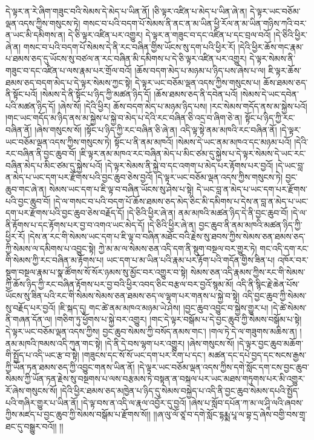 དེ་ལྟར་ན་རེ་ཞིག་གཟུང་བའི་སེམས་དེ་མེད་པ་ཡིན་ནོ། །ཅི་ལྟར་འཛིན་པ་མེད་པ་ཡིན་ཞེ་ན། དེ་ལྟར་ཡང་བཅོམ་ལྡན་འདས་ཀྱིས་གསུངས་ཏེ། གསང་བ་པའི་བདག་པོ་སེམས་ནི་ནང་ན་མ་ཡིན་ཕྱི་རོལ་ན་མ་ཡིན་གཉིས་ཀའི་བར་ན་ཡང་མི་དམིགས་ན། དེ་ཅི་ལྟར་འཛིན་པར་འགྱུར། དེ་ལྟར་ན་གཟུང་བ་དང་འཛིན་པ་དང་བྲལ་བའོ། །དེ་ཅིའི་ཕྱིར་ཞེ་ན། གསང་བ་པའི་བདག་པོ་སེམས་དེ་ནི་རང་བཞིན་གྱིས་ཡོངས་སུ་དག་པའི་ཕྱིར་རོ། །དེའི་ཕྱིར་ཆོས་གང་རྣམ་པ་ཐམས་ཅད་དུ་ཡོངས་སུ་བཙལ་ན་རང་བཞིན་མི་དམིགས་པ་དེ་ཅི་ལྟར་འཛིན་པར་འགྱུར། དེ་ལྟར་སེམས་ནི་གཟུང་བ་དང་འཛིན་པ་ལས་རྣམ་པར་གྲོལ་བའོ། །ཆོས་བདག་མེད་པ་མཉམ་པ་ཉིད་པས་ཞེས་པ་ལ། ཇི་ལྟར་ཆོས་ཐམས་ཅད་བདག་མེད་པ་དེ་ལྟར་སེམས་ཀྱང་སྟེ། དེ་ལྟར་ཡང་བཅོམ་ལྡན་འདས་ཀྱིས་གསུངས་པ། ཆོས་ཐམས་ཅད་ནི་སྟོང་པའོ། །སེམས་དེ་ནི་སྟོང་པ་ཉིད་ཀྱི་མཚན་ཉིད་དོ། །ཆོས་ཐམས་ཅད་ནི་དབེན་པའོ། །སེམས་དེ་ཡང་དབེན་པའི་མཚན་ཉིད་དོ། །ཞེས་སོ། །དེའི་ཕྱིར། ཆོས་བདག་མེད་པ་མཉམ་ཉིད་པས། །རང་སེམས་གདོད་ནས་མ་སྐྱེས་པའོ། །གང་ཡང་གདོད་མ་ཉིད་ནས་མ་སྐྱེས་པ་སྐྱེ་བ་མེད་པ་དེའི་རང་བཞིན་ཅི་འདྲ་བ་ཞིག་ཅེ་ན། སྟོང་པ་ཉིད་ཀྱི་རང་བཞིན་ནོ། །ཞེས་གསུངས་སོ། །སྟོང་པ་ཉིད་ཀྱི་རང་བཞིན་ཅི་ཞེ་ན། འདི་ལྟ་སྟེ་ནམ་མཁའི་རང་བཞིན་ནོ། །དེ་ལྟར་ཡང་བཅོམ་ལྡན་འདས་ཀྱིས་གསུངས་ཏེ། སྟོང་པ་ནི་ནམ་མཁའོ། །སེམས་དེ་ཡང་ནམ་མཁའ་དང་མཉམ་པའོ། །དེའི་རང་བཞིན་ནི་བྱང་ཆུབ་བོ། །ཇི་ལྟར་ནམ་མཁའ་རང་བཞིན་མེད་པ་མིང་ཙམ་དུ་སྐྱེས་པ་དེ་ལྟར་སེམས་དེ་ཡང་རང་བཞིན་མེད་པ་མིང་ཙམ་དུ་སྐྱེས་པའོ། །དེ་ལྟར་སེམས་ནི་སྐྱེ་བ་དང་འགག་པ་མེད་པར་རྟོགས་པར་བྱའོ། །དེ་ཡང་བླ་ན་མེད་པ་ཡང་དག་པར་རྫོགས་པའི་བྱང་ཆུབ་ཅེས་བྱའོ། །དེ་ལྟར་ཡང་བཅོམ་ལྡན་འདས་ཀྱིས་གསུངས་ཏེ། བྱང་ཆུབ་གང་ཞེ་ན། སེམས་ཡང་དག་པ་ཇི་ལྟ་བ་བཞིན་ཡོངས་སུ་ཤེས་པ་སྟེ། དེ་ཡང་བླ་ན་མེད་པ་ཡང་དག་པར་རྫོགས་པའི་བྱང་ཆུབ་བོ། །དེ་ལ་གསང་བ་པའི་བདག་པོ་ཆོས་ཐམས་ཅད་མེད་ཅིང་མི་དམིགས་པ་དེས་ན་བླ་ན་མེད་པ་ཡང་དག་པར་རྫོགས་པའི་བྱང་ཆུབ་ཅེས་བརྗོད་དོ། །དེ་ཅིའི་ཕྱིར་ཞེ་ན། ནམ་མཁའི་མཚན་ཉིད་དེ་ནི་བྱང་ཆུབ་བོ། །དེ་ལ་ནི་རྟོགས་པ་དང་རྟོགས་པར་བྱ་བ་འགའ་ཡང་མེད་དོ། །དེ་ཅིའི་ཕྱིར་ཞེ་ན། བྱང་ཆུབ་ནི་ནམ་མཁའི་མཚན་ཉིད་ཀྱི་ཕྱིར་རོ། །དེས་ན་རང་གི་སེམས་ཡང་དག་པ་ཇི་ལྟ་བ་བཞིན་མཐོང་བའི་རྗེས་སུ་ཐབས་ཀྱིས་སེམས་ཅན་ཐམས་ཅད་ཀྱི་སེམས་ལ་དམིགས་པ་འབྱུང་སྟེ། ཀྱེ་མ་མ་ལ་སེམས་ཅན་འདི་དག་ནི་སྡུག་བསྔལ་བར་གྱུར་ཏེ། གང་འདི་དག་རང་གི་སེམས་ཀྱི་རང་བཞིན་མ་རྟོགས་པ། ཡང་དག་པ་མ་ཡིན་པའི་རྣམ་པར་རྟོག་པའི་གདོན་གྱིས་ཟིན་པ། འཁོར་བར་སྡུག་བསྔལ་རྣམ་པ་སྣ་ཚོགས་སོ་སོར་ཉམས་སུ་མྱོང་བར་འགྱུར་བ་སྟེ། སེམས་ཅན་འདི་རྣམས་ཀྱིས་རང་གི་སེམས་ཀྱི་ཆོས་ཉིད་ཀྱི་རང་བཞིན་རྟོགས་པར་བྱ་བའི་ཕྱིར་འབད་ཅིང་བརྩལ་བར་བྱའོ་སྙམ་མོ། འདི་ནི་སྙིང་རྗེ་ཆེན་པོས་ཡོངས་སུ་ཟིན་པའི་རང་གི་སེམས་སེམས་ཅན་ཐམས་ཅད་ལ་ལྷག་པར་གནས་པ་སྐྱེ་བ་སྟེ། འདི་བྱང་ཆུབ་ཀྱི་སེམས་སུ་བརྗོད་པར་བྱའོ། །ཇི་སྐད་དུ། གང་ཚེ་ནམ་མཁའ་མཉམ་ཡེ་ཤེས། །བྱང་ཆུབ་འབྱུང་བ་སྐྱེས་གྱུར་པ། །དེ་ཚེ་སེམས་ནི་གཞན་དོན་ལ། །གཅིག་ཏུ་ཕྱོགས་པ་སྐྱེ་བར་འགྱུར། །གང་དེ་ལྟར་བསྒོམ་པ་དེ་བྱང་ཆུབ་ཀྱི་སེམས་བསྒོམ་པ་སྟེ། དེ་ལྟར་ཡང་བཅོམ་ལྡན་འདས་ཀྱིས། བྱང་ཆུབ་སེམས་ཀྱི་བསོད་ནམས་གང་། །གལ་ཏེ་དེ་ལ་གཟུགས་མཆིས་ན། །ནམ་མཁའི་ཁམས་འདི་ཀུན་གང་སྟེ། །དེ་ནི་དེ་བས་ལྷག་པར་འགྱུར། །ཞེས་གསུངས་སོ། །དེ་ལྟར་བྱང་ཆུབ་མཆོག་གི་སྤྱོད་པ་འདི་ཡང་རྩ་བ་སྟེ། །གཟུངས་དང་སོ་སོ་ཡང་དག་པར་རིག་པ་དང་། མཚན་དང་དཔེ་བྱད་དང་སངས་རྒྱས་ཀྱི་ཡོན་ཏན་ཐམས་ཅད་ཀྱི་འབྱུང་གནས་ཡིན་ནོ། །དེ་ལྟར་ཡང་བཅོམ་ལྡན་འདས་ཀྱིས་དགེ་སློང་དག་ངས་བྱང་ཆུབ་སེམས་ཀྱི་ཡོན་ཏན་རྗེས་སུ་བསྔགས་པ་ལས་བརྩམས་ཏེ་བསྟན་ན་བསྐལ་པར་ཡང་མཐས་གཏུགས་པར་མི་འགྱུར་རོ་ཞེས་གསུངས་སོ། །དེའི་ཕྱིར་ཐམས་ཅད་མཁྱེན་པ་ཉིད་དུ་སེམས་བསྐྱེད་པ་འདི་ནི་བྱང་ཆུབ་སེམས་དཔའི་སྤྱོད་པའི་གཞིར་གྱུར་པ་ཡིན་ནོ། །དེ་ལྟ་བས་ན་འདི་ལ་རྣལ་འབྱོར་དུ་བྱའོ། །ཞེས་པ་སློབ་དཔོན་ཀ་མ་ལ་ཤཱི་ལའི་ཞབས་ཀྱིས་མཛད་པ་བྱང་ཆུབ་ཀྱི་སེམས་བསྒོམ་པ་རྫོགས་སོ།། །།ཞ་ལུ་ལོ་ཙཱ་བ་དགེ་སློང་དྷརྨྨ་པཱ་ལ་བྷ་དྲ་ཞེས་བགྱི་བས་གྲྭ་ཐང་དུ་བསྒྱུར་བའོ།། །།
